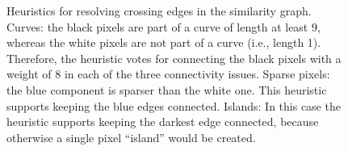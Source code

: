 \documentclass[]{usiinfbachelorproject}
\begin{document}
\begin{figure}[ht]
	\centering
	\caption{Heuristics for resolving crossing edges in the similarity graph.  Curves: the black pixels are part of a curve of length at least 9, whereas the white pixels are not part of a curve (i.e., length 1). Therefore, the heuristic votes for connecting the black pixels with a weight of 8 in each of the three connectivity issues.  Sparse pixels: the blue component is sparser than the white one. This heuristic supports keeping the blue edges connected.  Islands: In this case the heuristic supports keeping the darkest edge connected, because otherwise a single pixel ``island'' would be created.}
	\label{fig:heuristics}
\end{figure}
\end{document}
